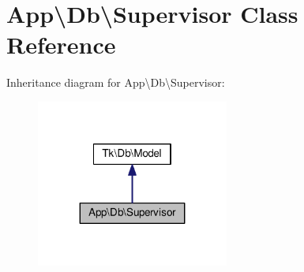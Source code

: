 \hypertarget{classApp_1_1Db_1_1Supervisor}{\section{App\textbackslash{}Db\textbackslash{}Supervisor Class Reference}
\label{classApp_1_1Db_1_1Supervisor}
}


Inheritance diagram for App\textbackslash{}Db\textbackslash{}Supervisor\+:\nopagebreak
\begin{figure}[H]
\begin{center}
\leavevmode
\includegraphics[width=179pt]{classApp_1_1Db_1_1Supervisor__inherit__graph}
\end{center}
\end{figure}
